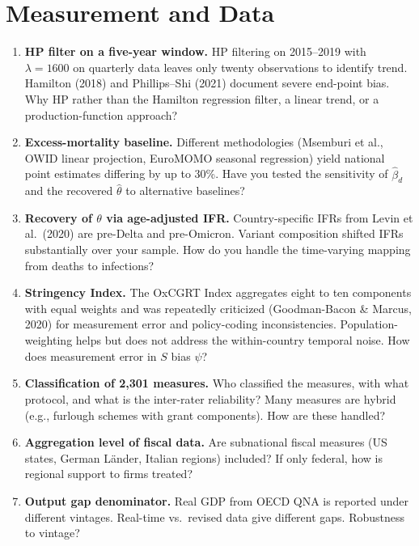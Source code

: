 \documentclass[11pt,a4paper]{article}
\begin{document}
\section{Measurement and Data}

\begin{enumerate}
\item \textbf{HP filter on a five-year window.} HP filtering on 2015--2019 with $\lambda=1600$ on quarterly data leaves only twenty observations to identify trend. Hamilton (2018) and Phillips--Shi (2021) document severe end-point bias. Why HP rather than the Hamilton regression filter, a linear trend, or a production-function approach?

\item \textbf{Excess-mortality baseline.} Different methodologies (Msemburi et al., OWID linear projection, EuroMOMO seasonal regression) yield national point estimates differing by up to 30\%. Have you tested the sensitivity of $\hat\beta_d$ and the recovered $\hat\theta$ to alternative baselines?

\item \textbf{Recovery of $\theta$ via age-adjusted IFR.} Country-specific IFRs from Levin et al.\ (2020) are pre-Delta and pre-Omicron. Variant composition shifted IFRs substantially over your sample. How do you handle the time-varying mapping from deaths to infections?

\item \textbf{Stringency Index.} The OxCGRT Index aggregates eight to ten components with equal weights and was repeatedly criticized (Goodman-Bacon \& Marcus, 2020) for measurement error and policy-coding inconsistencies. Population-weighting helps but does not address the within-country temporal noise. How does measurement error in $S$ bias $\hat\psi$?

\item \textbf{Classification of 2{,}301 measures.} Who classified the measures, with what protocol, and what is the inter-rater reliability? Many measures are hybrid (e.g., furlough schemes with grant components). How are these handled?

\item \textbf{Aggregation level of fiscal data.} Are subnational fiscal measures (US states, German Länder, Italian regions) included? If only federal, how is regional support to firms treated?

\item \textbf{Output gap denominator.} Real GDP from OECD QNA is reported under different vintages. Real-time vs.\ revised data give different gaps. Robustness to vintage?
\end{enumerate}
\end{document}
